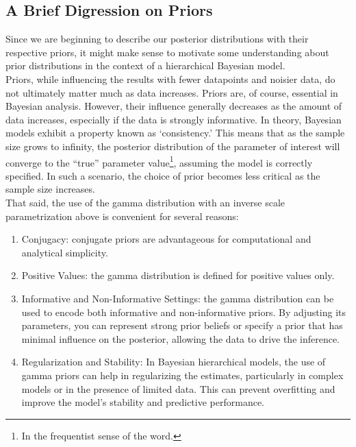 \documentclass[11pt]{article}
\begin{document}
\subsection{A Brief Digression on Priors}
Since we are beginning to describe our posterior distributions with their respective priors, it might make sense to motivate some understanding about prior distributions in the context of a hierarchical Bayesian model. \\

Priors, while influencing the results with fewer datapoints and noisier data, do not ultimately matter much as data increases. Priors are, of course, essential in Bayesian analysis. However, their influence generally decreases as the amount of data increases, especially if the data is strongly informative. In theory, Bayesian models exhibit a property known as `consistency.' This means that as the sample size grows to infinity, the posterior distribution of the parameter of interest will converge to the ``true'' parameter value\footnote{In the frequentist sense of the word.}, assuming the model is correctly specified. In such a scenario, the choice of prior becomes less critical as the sample size increases. \\

That said, the use of the gamma distribution with an inverse scale parametrization above is convenient for several reasons:
\begin{enumerate}
	\item Conjugacy: conjugate priors are advantageous for computational and analytical simplicity. 
	\item Positive Values: the gamma distribution is defined for positive values only.
	\item Informative and Non-Informative Settings: the gamma distribution can be used to encode both informative and non-informative priors. By adjusting its parameters, you can represent strong prior beliefs or specify a prior that has minimal influence on the posterior, allowing the data to drive the inference.
	\item Regularization and Stability: In Bayesian hierarchical models, the use of gamma priors can help in regularizing the estimates, particularly in complex models or in the presence of limited data. This can prevent overfitting and improve the model's stability and predictive performance.
\end{enumerate}

\end{document}
